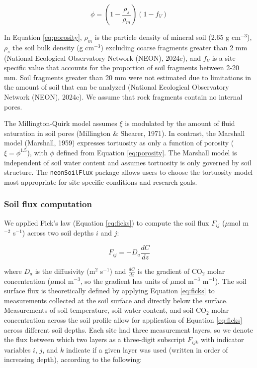 \documentclass[
  letterpaper,
  DIV=11,
  numbers=noendperiod]{scrartcl}
\begin{document}
\begin{equation}
  \phi = \left(1- \frac{\rho_{s}}{\rho_{m}} \right) \left(1-f_{V}\right)
  \label{eq:porosity}
\end{equation}

In Equation \ref{eq:porosity}, \(\rho_{m}\) is the particle density of
mineral soil (2.65 g cm\(^{-3}\)), \(\rho_{s}\) the soil bulk density (g
cm\(^{-3}\)) excluding coarse fragments greater than 2 mm (National
Ecological Observatory Network (NEON), 2024c), and \(f_{V}\) is a
site-specific value that accounts for the proportion of soil fragments
between 2-20 mm. Soil fragments greater than 20 mm were not estimated
due to limitations in the amount of soil that can be analyzed (National
Ecological Observatory Network (NEON), 2024c). We assume that rock
fragments contain no internal pores.

The Millington-Quirk model assumes \(\xi\) is modulated by the amount of
fluid saturation in soil pores (Millington \& Shearer, 1971). In
contrast, the Marshall model (Marshall, 1959) expresses tortuosity as
only a function of porosity (\(\xi = \phi^{1.5}\)), with \(\phi\)
defined from Equation \ref{eq:porosity}. The Marshall model is
independent of soil water content and assumes tortuosity is only
governed by soil structure. The \texttt{neonSoilFlux} package allows
users to choose the tortuosity model most appropriate for site-specific
conditions and research goals.

\subsubsection{Soil flux computation}\label{sec-compute-soil-flux}

We applied Fick's law (Equation \ref{eq:ficks}) to compute the soil flux
\(F_{ij}\) (\(\mu\)mol m\(^{-2}\) s\(^{-1}\)) across two soil depths
\(i\) and \(j\):

\begin{equation}
  F_{ij} = -D_{a} \frac{dC}{dz}
  \label{eq:ficks}
\end{equation}

where \(D_{a}\) is the diffusivity (m\(^{2}\) s\(^{-1}\)) and
\(\frac{dC}{dz}\) is the gradient of CO\(_{2}\) molar concentration
(\(\mu\)mol m\(^{-3}\), so the gradient has units of \(\mu\)mol
m\(^{-3}\) m\(^{-1}\)). The soil surface flux is theoretically defined
by applying Equation \ref{eq:ficks} to measurements collected at the
soil surface and directly below the surface. Measurements of soil
temperature, soil water content, and soil CO\(_{2}\) molar concentration
across the soil profile allow for application of Equation \ref{eq:ficks}
across different soil depths. Each site had three measurement layers, so
we denote the flux between which two layers as a three-digit subscript
\(F_{ijk}\) with indicator variables \(i\), \(j\), and \(k\) indicate if
a given layer was used (written in order of increasing depth), according
to the following:
\end{document}
